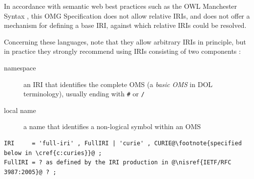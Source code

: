 \documentclass[10pt,%
\ifpretendfinal
final%
\else
draft%
\fi,
]{scrreprt}
\makeatletter
\newcommand*\CommentAuthor{}
\renewcommand*\CommentAuthor{#1}}
\newcommand*\CommentDate{}
\renewcommand*\CommentDate{#1}}
\newcommand*\CommentId{}
\renewcommand*\CommentId{#1}}
\newcommand*\CommentType{}
\renewcommand*\CommentType{#1}}
\newcommand*{\SetCommentColorByType}[1]{%
\edef\localType{{#1}}%
\expandafter\ifstrequal\localType{q-aut}{\colorlet{CommentColor}{red}}{%
\expandafter\ifstrequal\localType{q-all}{\colorlet{CommentColor}{orange}}{%
\expandafter\ifstrequal\localType{todo}{\colorlet{CommentColor}{orange}}{%
\expandafter\ifstrequal\localType{fyi}{\colorlet{CommentColor}{lightgray}}{%
\colorlet{CommentColor}{yellow}}}}}}
\newcommand*{\SetCommentPrefixByType}[1]{%
\edef\localType{{#1}}%
\expandafter\@ifmtarg\localType{%
\edef\CommentPrefix{}%
}{%
\caseupper[q]{#1}%
\edef\CommentPrefix{\thestring: }%
}}
\newcommand*{\initComment}[1]{%
\setkeys{Comment}{#1}%
\SetCommentColorByType{\CommentType}%
\relax%
\SetCommentPrefixByType{\CommentType}%
\relax%
}
\newcommand*{\todonote}[2][]{%
\initComment{#1}%
\pdfcomment[author=\CommentAuthor,color=CommentColor,date=\CommentDate,id=\CommentId]{%
\CommentPrefix
#2}}
\renewcommand*{\todonote}[2][]{%
\initComment{#1}%
\ednote{\CommentPrefix #2}}
\newcommand*{\syntax}[1]{\texttt{#1}}
\newcommand*{\IS}{OMG Specification\xspace}
\newcommand{\clauserefname}{clause}
\newcommand{\cref}[1]{\clauserefname~\ref{#1}}
\newcommand{\nisref}[1]{#1}
\makeatother
\begin{document}


In accordance with semantic web best practices such as the OWL Manchester Syntax \cite{W3C:NOTE-owl2-manchester-syntax-20091027}, this \IS does not allow relative IRIs, and does not offer a mechanism for defining a base IRI, against which relative IRIs could be resolved.

Concerning these languages, note that they allow arbitrary IRIs in principle, but in practice they strongly recommend using IRIs consisting of two components \cite{W3C:NOTE-swbp-vocab-pub-20080828}:
\begin{description}
\item[namespace] an IRI that identifies the complete OMS (a \emph{basic OMS} in DOL terminology), usually ending with \syntax{\#} or \syntax{/}
\item[local name] a name that identifies a non-logical symbol within an OMS
\end{description}

\begin{lstlisting}[language=ebnf,escapechar=@]
IRI     = 'full-iri' , FullIRI | 'curie' , CURIE@\footnote{specified below in \cref{c:curies}}@ ;
FullIRI = ? as defined by the IRI production in @\nisref{IETF/RFC 3987:2005}@ ? ;
\end{lstlisting}
\end{document}
